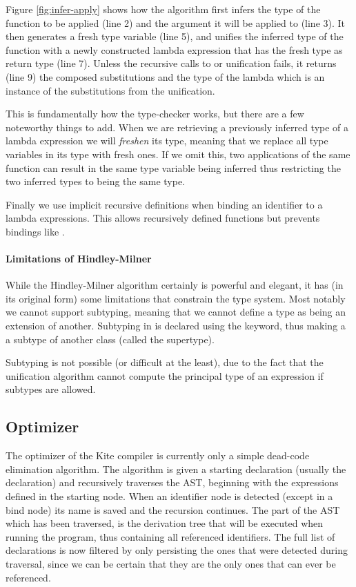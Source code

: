 Figure \ref{fig:infer-apply} shows how the algorithm first infers the type of the function to be applied (line 2) and the argument it will be applied to (line 3). It then generates a fresh type variable (line 5), and unifies the inferred type of the function with a newly constructed lambda expression that has the fresh type as return type (line 7). Unless the recursive calls to  or unification fails, it returns (line 9) the composed substitutions and the type of the lambda which is an instance of the substitutions from the unification.

This is fundamentally how the type-checker works, but there are a few noteworthy things to add. When we are retrieving a previously inferred type of a lambda expression we will \emph{freshen} its type, meaning that we replace all type variables in its type with fresh ones. If we omit this, two applications of the same function can result in the same type variable being inferred thus restricting the two inferred types to being the same type.

Finally we use implicit recursive definitions when binding an identifier to a lambda expressions. This allows recursively defined functions but prevents bindings like .

\paragraph{Limitations of Hindley-Milner}
While the Hindley-Milner algorithm certainly is powerful and elegant, it has (in its original form) some limitations that constrain the type system. Most notably we cannot support subtyping, meaning that we cannot define a type as being an extension of another. Subtyping in  is declared using the  keyword, thus making a  a subtype of another class (called the supertype).

Subtyping is not possible (or difficult at the least), due to the fact that the unification algorithm cannot compute the principal type of an expression if subtypes are allowed.

\subsection{Optimizer}
\label{sec:impl-optimizer}
The optimizer of the Kite compiler is currently only a simple dead-code elimination algorithm. The algorithm is given a starting declaration (usually the  declaration) and recursively traverses the AST, beginning with the expressions defined in the starting node. When an identifier node is detected (except in a bind node) its name is saved and the recursion continues. The part of the AST which has been traversed, is the derivation tree that will be executed when running the program, thus containing all referenced identifiers. The full list of declarations is now filtered by only persisting the ones that were detected during traversal, since we can be certain that they are the only ones that can ever be referenced.

